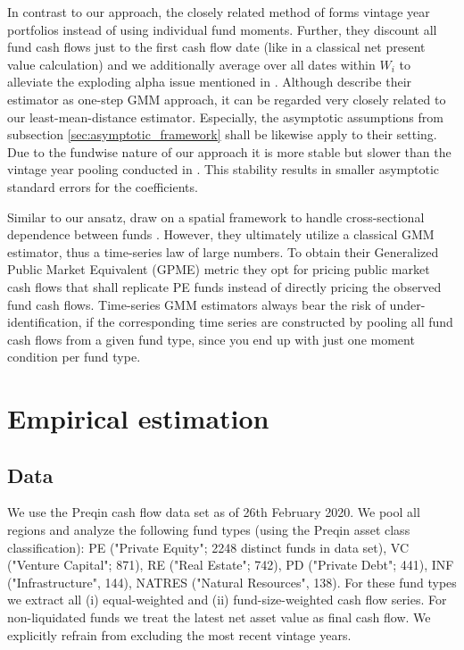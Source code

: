 \documentclass[12pt]{article}
\begin{document}
In contrast to our approach, the closely related method of \cite{DLP12} forms vintage year portfolios instead of using individual fund moments.
Further, they discount all fund cash flows just to the first cash flow date (like in a classical net present value calculation) and we additionally average over all dates within $W_{i}$ to alleviate the exploding alpha issue mentioned in \cite{DLP12}.
Although \cite{DLP12} describe their estimator as one-step GMM approach, it can be regarded very closely related to our least-mean-distance estimator.
Especially, the asymptotic assumptions from subsection \ref{sec:asymptotic_framework} shall be likewise apply to their setting.
Due to the fundwise nature of our approach it is more stable but slower than the vintage year pooling conducted in \cite{DLP12}.
This stability results in smaller asymptotic standard errors for the coefficients.

Similar to our ansatz, \cite{KN16} draw on a spatial framework to handle cross-sectional dependence between funds \citep{C99}.
However, they ultimately utilize a classical GMM estimator, thus a time-series law of large numbers.
To obtain their Generalized Public Market Equivalent (GPME) metric they opt for pricing public market cash flows that shall replicate PE funds instead of directly pricing the observed fund cash flows.
Time-series GMM estimators always bear the risk of under-identification, if the corresponding time series are constructed by pooling all fund cash flows from a given fund type, since you end up with just one moment condition per fund type.


\section{Empirical estimation}
\label{sec:empirical_estimation}

\subsection{Data}

We use the Preqin cash flow data set as of 26th February 2020.
We pool all regions and analyze the following fund types (using the Preqin asset class classification):
PE ("Private Equity"; 2248 distinct funds in data set),
VC ("Venture Capital"; 871),
RE ("Real Estate"; 742),
PD ("Private Debt"; 441),
INF ("Infrastructure", 144), 
NATRES ("Natural Resources", 138).
For these fund types we extract all (i) equal-weighted and (ii) fund-size-weighted cash flow series.
For non-liquidated funds we treat the latest net asset value as final cash flow.
We explicitly refrain from excluding the most recent vintage years.
\end{document}
